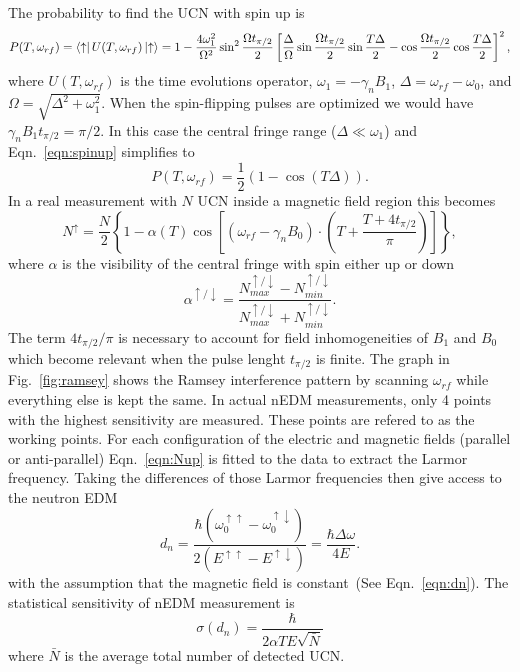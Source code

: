 The probability to find the UCN with spin up is
\begin{equation}
  \label{eqn:spinup}
  P(T, \omega_{rf}) = \bra{\uparrow} U(T, \omega_{rf}) \ket{\uparrow}
  = 1 - \frac{4 \omega_1^2}{\Omega^2} \sin ^2 \frac{\Omega t_{\pi/2}}{2} \left[ \frac{\Delta}{\Omega} \sin  \frac{\Omega t_{\pi/2}}{2} \sin \frac{T\Delta}{2} - \cos  \frac{\Omega t_{\pi/2}}{2} \cos\frac{T\Delta}{2} \right]^2,
\end{equation}
where $U(T, \omega_{rf})$ is the time evolutions operator,
$\omega_1 = - \gamma_n B_1$, $\Delta = \omega_{rf} - \omega_0$, and
$\Omega = \sqrt{\Delta^2 + \omega_1^2}$. When the spin-flipping pulses
are optimized we would have $\gamma_n B_1 t_{\pi/2} = \pi / 2$. In
this case the central fringe range ($\Delta \ll \omega_1$) and
Eqn.~\ref{eqn:spinup} simplifies to
\begin{equation}
  P(T, \omega_{rf}) = \frac{1}{2} \left( 1 - \cos(T\Delta) \right).
\end{equation}
In a real measurement with $N$ UCN inside a magnetic field region this becomes
\begin{equation}
  \label{eqn:Nup}
N^{\uparrow} = \frac{N}{2} \left\lbrace 1 - \alpha(T) \cos \left[ (\omega_{rf} - \gamma_n B_0 ) \cdot \left(T+\frac{T+4t_{\pi/2}}{\pi}\right)\right]\right\rbrace,
\end{equation}
where $\alpha$ is the visibility of the central fringe with spin either up or down
\begin{equation}
  \label{eqn:visibility}
  \alpha^{\uparrow /\downarrow} = \frac{N_{max}^{\uparrow /\downarrow} - N_{min}^{\uparrow /\downarrow}}{N_{max}^{\uparrow /\downarrow}+ N_{min}^{\uparrow /\downarrow}}.
\end{equation}
The term $4t_{\pi/2}/\pi$ is necessary to account for field
inhomogeneities of $B_1$ and $B_0$ which become relevant when the
pulse lenght $t_{\pi/2}$ is finite. The graph in Fig.~\ref{fig:ramsey}
shows the Ramsey interference pattern by scanning $\omega_{rf}$ while
everything else is kept the same. In actual nEDM measurements, only 4
points with the highest sensitivity are measured. These points are
refered to as the working points. For each configuration of the
electric and magnetic fields (parallel or anti-parallel)
Eqn.~\ref{eqn:Nup} is fitted to the data to extract the Larmor
frequency. Taking the differences of those Larmor frequencies then
give access to the neutron EDM
\begin{equation}
  \label{eqn:fitteddn}
  d_n = \frac{\hbar (\omega_0 ^{\uparrow \uparrow} - \omega_0 ^{\uparrow \downarrow})}{2(E^{\uparrow \uparrow} - E^{\uparrow \downarrow})} = \frac{\hbar \Delta \omega}{4E}.
\end{equation}
with the assumption that the magnetic field is constant~(See
Eqn.~\ref{eqn:dn}).
The statistical sensitivity of nEDM measurement is
\begin{equation}
  \label{eqn:dnsensitivity}
\sigma(d_n) = \frac{\hbar}{2 \alpha T E \sqrt{\bar{N}}}
\end{equation}
where $\bar{N}$ is the average total number of detected UCN.

